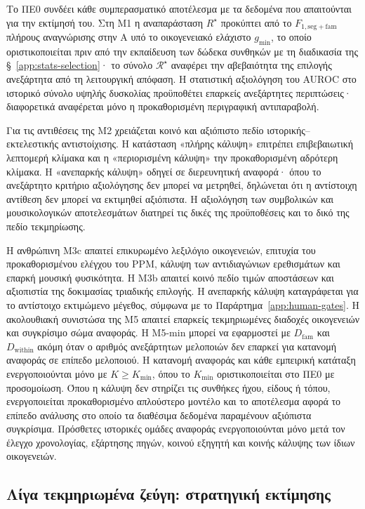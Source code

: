 \documentclass[11pt,a4paper]{article}
\begin{document}
Το ΠΕ0 συνδέει κάθε συμπερασματικό αποτέλεσμα με τα δεδομένα που απαιτούνται για την εκτίμησή του. Στη M1 η αναπαράσταση $R^\star$ προκύπτει από το $F_{1,\mathrm{seg+fam}}$ πλήρους αναγνώρισης στην A υπό το οικογενειακό ελάχιστο $g_{\min}$, το οποίο οριστικοποιείται πριν από την εκπαίδευση των δώδεκα συνθηκών με τη διαδικασία της §~\ref{app:stats-selection}· το σύνολο $\mathcal R^\star$ αναφέρει την αβεβαιότητα της επιλογής ανεξάρτητα από τη λειτουργική απόφαση. Η στατιστική αξιολόγηση του AUROC στο ιστορικό σύνολο υψηλής δυσκολίας προϋποθέτει επαρκείς ανεξάρτητες περιπτώσεις· διαφορετικά αναφέρεται μόνο η προκαθορισμένη περιγραφική αντιπαραβολή.

Για τις αντιθέσεις της M2 χρειάζεται κοινό και αξιόπιστο πεδίο ιστορικής--εκτελεστικής αντιστοίχισης. Η κατάσταση «πλήρης κάλυψη» επιτρέπει επιβεβαιωτική λεπτομερή κλίμακα και η «περιορισμένη κάλυψη» την προκαθορισμένη αδρότερη κλίμακα. Η «ανεπαρκής κάλυψη» οδηγεί σε διερευνητική αναφορά· όπου το ανεξάρτητο κριτήριο αξιολόγησης δεν μπορεί να μετρηθεί, δηλώνεται ότι η αντίστοιχη αντίθεση δεν μπορεί να εκτιμηθεί αξιόπιστα. Η αξιολόγηση των συμβολικών και μουσικολογικών αποτελεσμάτων διατηρεί τις δικές της προϋποθέσεις και το δικό της πεδίο τεκμηρίωσης.

Η ανθρώπινη M3c απαιτεί επικυρωμένο λεξιλόγιο οικογενειών, επιτυχία του προκαθορισμένου ελέγχου του PPM, κάλυψη των αντιδιαγώνιων ερεθισμάτων και επαρκή μουσική φυσικότητα. Η M3b απαιτεί κοινό πεδίο τιμών αποστάσεων και αξιοπιστία της δοκιμασίας τριαδικής επιλογής. Η ανεπαρκής κάλυψη καταγράφεται για το αντίστοιχο εκτιμώμενο μέγεθος, σύμφωνα με το Παράρτημα~\ref{app:human-gates}. Η ακολουθιακή συνιστώσα της M5 απαιτεί επαρκείς τεκμηριωμένες διαδοχές οικογενειών και συγκρίσιμο σώμα αναφοράς. Η M5-min μπορεί να εφαρμοστεί με $D_{\mathrm{fam}}$ και $D_{\mathrm{within}}$ ακόμη όταν ο αριθμός ανεξάρτητων μελοποιών δεν επαρκεί για κατανομή αναφοράς σε επίπεδο μελοποιού. Η κατανομή αναφοράς και κάθε εμπειρική κατάταξη ενεργοποιούνται μόνο με $K\ge K_{\min}$, όπου το $K_{\min}$ οριστικοποιείται στο ΠΕ0 με προσομοίωση. Όπου η κάλυψη δεν στηρίζει τις συνθήκες ήχου, είδους ή τόπου, ενεργοποιείται προκαθορισμένο απλούστερο μοντέλο και το αποτέλεσμα αφορά το επίπεδο ανάλυσης στο οποίο τα διαθέσιμα δεδομένα παραμένουν αξιόπιστα συγκρίσιμα. Πρόσθετες ιστορικές ομάδες αναφοράς ενεργοποιούνται μόνο μετά τον έλεγχο χρονολογίας, εξάρτησης πηγών, κοινού εξηγητή και κοινής κάλυψης των ίδιων οικογενειών.

\subsection{Λίγα τεκμηριωμένα ζεύγη: στρατηγική εκτίμησης}\label{sec:small-data}
\end{document}

